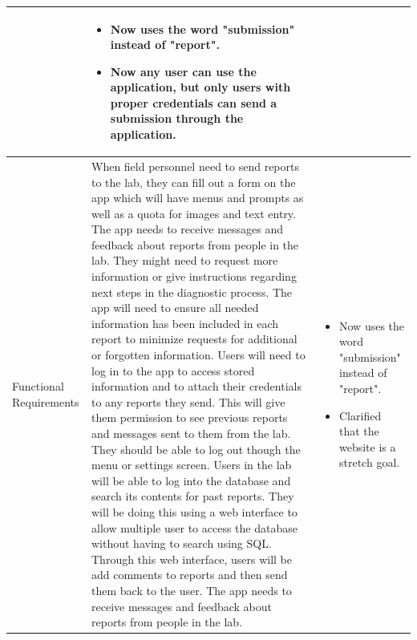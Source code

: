 \documentclass[onecolumn, draftclsnofoot,10pt, compsoc]{IEEEtran}
\begin{document}
\begin{table}[!hbt]
\begin{tabularx}{\textwidth}{|>{\setlength\hsize{.6\hsize}\setlength\linewidth{\hsize}}X|>{\setlength\hsize{1.6\hsize}\setlength\linewidth{\hsize}}X|>{\setlength\hsize{.8\hsize}\setlength\linewidth{\hsize}}X|}
\begin{itemize}
\end{itemize}
&
\begin{itemize}
    \item Now uses the word "submission" instead of "report".
    \item Now any user can use the application, but only users with proper credentials can send a submission through the application. 
\end{itemize}\\

\hline

Functional Requirements
&

When field personnel need to send reports to the lab, they can fill out a form on the app which will have menus and prompts as well as a quota for images and text entry.
\newline
The app needs to receive messages and feedback about reports from people in the lab. 
They might need to request more information or give instructions regarding next steps in the diagnostic process. 
The app will need to ensure all needed information has been included in each report to minimize requests for additional or forgotten information. 
\newline
Users will need to log in to the app to access stored information and to attach their credentials to any reports they send. This will give them permission to see previous reports and messages sent to them from the lab. 
They should be able to log out though the menu or settings screen. 
\newline 
Users in the lab will be able to log into the database and search its contents for past reports. They will be doing this using a web interface to allow multiple user to access the database without having to search using SQL. Through this web interface, users will be add comments to reports and then send them back to the user. 
\newline
The app needs to receive messages and feedback about reports from people in the lab. 
&
\begin{itemize}
    \item Now uses the word "submission" instead of "report".
    \item Clarified that the website is a stretch goal.
\end{itemize}\\

\hline
\end{tabularx}
\end{table}
\end{document}
